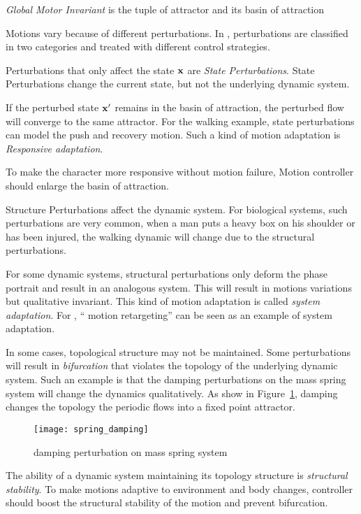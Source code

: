 \begin{mydef}
\emph{Global Motor Invariant} is the tuple of attractor and its basin of attraction
\end{mydef}


Motions vary because of different perturbations.
In \moit, perturbations are classified in two categories and treated with different control strategies.

\begin{itemize}

Perturbations that only affect the state $\mathbf{x}$ are \emph{State Perturbations}.
State Perturbations change the current state, but not the underlying dynamic system.


If the perturbed state $\mathbf{x}'$ remains in the basin of attraction, the perturbed flow will converge to the same attractor. 
For the walking example, state perturbations can model the push and recovery motion.
Such a kind of motion adaptation is \emph{Responsive adaptation}.


To make the character more responsive without motion failure,
Motion controller should enlarge the basin of attraction.






Structure Perturbations affect the dynamic system.
For biological systems,  such perturbations are very common, when a man puts a heavy box on his shoulder or has been injured, the walking dynamic will change due to the structural perturbations.


For some dynamic systems, structural perturbations only deform the phase portrait and result in an analogous system.
This will result in motions variations but qualitative invariant. This kind of motion adaptation is called \emph{system adaptation}.
For \cms, `` motion retargeting'' can be seen as an example of system adaptation.

In some cases, topological structure may not be maintained.
Some perturbations will result in \emph{bifurcation} that violates the topology of the underlying dynamic system.
Such an  example is that the damping perturbations on the mass spring system will change the dynamics qualitatively.
As show in Figure~\ref{fig:dampmass}, damping changes the topology the periodic flows into a fixed point attractor.

\begin{figure}
\begin{center}
\texttt{[image: spring\_damping]}
\end{center}
\caption{damping perturbation on mass spring system}
\label{fig:dampmass}
\end{figure}

The ability of a dynamic system maintaining its topology structure is \emph{structural stability}.
To make motions adaptive to environment and body changes, controller should boost the structural stability of the motion and prevent bifurcation.
\end{itemize}

